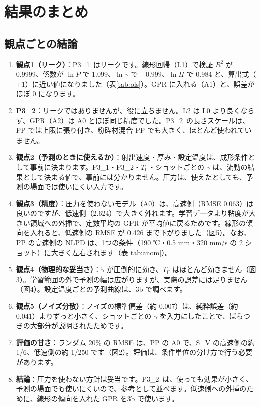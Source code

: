 \documentclass[paper=a4paper,fontsize=10.5pt,line_length=44zw,number_of_lines=38]{jlreq}
\newcommand{\gd}{\dot{\gamma}}
\newcommand{\PI}{P3\_1}
\newcommand{\PII}{P3\_2}
\newcommand{\Tff}{T_{\mathrm{ff}}}
\begin{document}
\section{結果のまとめ}

\subsection{観点ごとの結論}
\begin{enumerate}[itemsep=0.6ex,topsep=0.6ex]
\item \textbf{観点1（リーク）}：\PI\ はリークです。線形回帰（L1）で検証 $R^2$ が 0.9999、係数が $\ln P$ で 1.099、$\ln\gd$ で $-0.999$、$\ln H$ で 0.984 と、算出式（$\pm 1$）に近い値になりました（表\ref{tab:ols}）。GPR に入れる（A1）と、誤差がほぼ 0 になります。
\item \textbf{\PII}：リークではありませんが、役に立ちません。L2 は L0 より良くならず、GPR（A2）は A0 とほぼ同じ精度でした。\PII\ の長さスケールは、PP では上限に張り付き、粉砕材混合 PP でも大きく、ほとんど使われていません。
\item \textbf{観点2（予測のときに使えるか）}：射出速度・厚み・設定温度は、成形条件として事前に決まります。\PI・\PII・$\Tff$・ショットごとの $\gd$ は、流動の結果として決まる値で、事前には分かりません。圧力は、使えたとしても、予測の場面では使いにくい入力です。
\item \textbf{観点3（精度）}：圧力を使わないモデル（A0）は、高速側（RMSE 0.063）は良いのですが、低速側（2.624）で大きく外れます。学習データより粘度が大きい領域への外挿で、定数平均の GPR が平均値に戻るためです。線形の傾向を入れると、低速側の RMSE が 0.426 まで下がりました（図5）。なお、PP の高速側の NLPD は、1つの条件（190 ℃・0.5 mm・320 mm/s の 2 ショット）に大きく左右されます（表\ref{tab:anom}）。
\item \textbf{観点4（物理的な妥当さ）}：$\gd$ が圧倒的に効き、$\Tff$ はほとんど効きません（図3）。学習範囲の外で予測の幅は広がりますが、実際の誤差には足りません（図4）。設定温度ごとの予測曲線は、3b で調べます。
\item \textbf{観点5（ノイズ分散）}：ノイズの標準偏差（約 0.007）は、純粋誤差（約 0.041）よりずっと小さく、ショットごとの $\gd$ を入力にしたことで、ばらつきの大部分が説明されたためです。
\item \textbf{評価の甘さ}：ランダム 20\% の RMSE は、PP の A0 で、S\_V の高速側の約 1/6、低速側の約 1/250 です（図2）。評価は、条件単位の分け方で行う必要があります。
\item \textbf{結論}：圧力を使わない方針は妥当です。\PII\ は、使っても効果が小さく、予測の場面でも使いにくいので、参考として並べます。低速側への外挿のために、線形の傾向を入れた GPR を3b で使います。
\end{enumerate}
\end{document}
